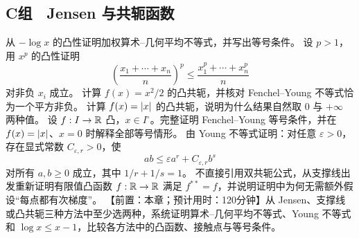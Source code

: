 \subsection*{C组　Jensen 与共轭函数}
\begin{enumerate}[label=\textbf{\thechapter.\arabic*.},resume]
  从 \(-\log x\) 的凸性证明加权算术--几何平均不等式，并写出等号条件。
  设 \(p>1\)，用 \(x^p\) 的凸性证明
 \[
  \left(\frac{x_1+\cdots+x_n}{n}\right)^p
  \le\frac{x_1^p+\cdots+x_n^p}{n}
 \]
 对非负 \(x_i\) 成立。
  计算 \(f(x)=x^2/2\) 的凸共轭，并核对 Fenchel--Young 不等式恰为一个平方非负。
  计算 \(f(x)=\left|x\right|\) 的凸共轭，说明为什么结果自然取 \(0\) 与 \(+\infty\) 两种值。
  设 \(f:I\to\mathbb{R}\) 凸，\(x\in I^\circ\)。完整证明 Fenchel--Young 等号条件，并在 \(f(x)=\left|x\right|\)、\(x=0\) 时解释全部等号情形。
  由 Young 不等式证明：对任意 \(\varepsilon>0\)，存在显式常数 \(C_{\varepsilon,r}>0\)，使
 \[
  ab\le\varepsilon a^r+C_{\varepsilon,r}b^s
 \]
 对所有 \(a,b\ge0\) 成立，其中 \(1/r+1/s=1\)。
  不直接引用双共轭公式，从支撑线出发重新证明有限值凸函数 \(f:\mathbb{R}\to\mathbb{R}\) 满足 \(f^{**}=f\)，并说明证明中为何无需额外假设“每点都有次梯度”。
  【前置：本章；预计用时：120分钟】从 Jensen、支撑线或凸共轭三种方法中至少选两种，系统证明算术--几何平均不等式、Young 不等式和 \(\log x\le x-1\)，比较各方法中的凸函数、接触点与等号条件。
\end{enumerate}

